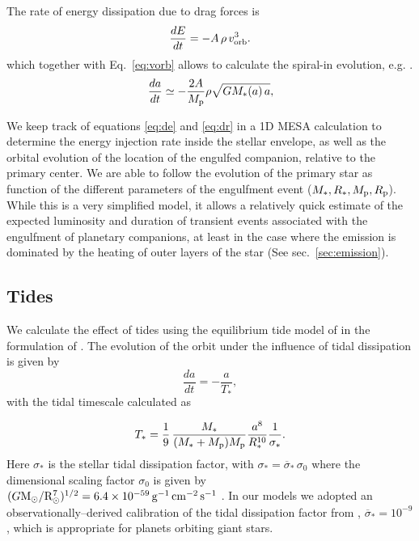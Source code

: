 \documentclass[twocolumn]{aastex62}
\newcommand{\mso}{\ensuremath{{\rm M}_\odot}}
\newcommand{\rso}{\ensuremath{{\rm R}_\odot}}
\begin{document}
The rate of energy dissipation due to drag forces is 
\begin{equation}\label{eq:de}
\frac{dE}{dt} = - A\, \rho \,v_{\rm orb}^3 .
\end{equation}
which together with Eq.~\ref{eq:vorb} allows to calculate the spiral-in evolution, e.g. \citet{Tylenda:2006}. 
\begin{equation}\label{eq:dr}
\frac{da}{dt} \simeq -\frac{2A}{M_{\rm p}} \rho \sqrt{G M_*(a)\, a},
\end{equation}

We keep track of equations \ref{eq:de} and \ref{eq:dr} in a 1D MESA calculation to determine the energy injection rate inside the stellar envelope, as well as the orbital evolution of the location of the engulfed companion, relative to the primary center.  
We are able to follow the evolution of the primary star as function of the different parameters of the engulfment event ($M_*, R_*, M_{\rm p}, R_{\rm p}$). While this is a very simplified model, it allows a relatively quick estimate of the expected luminosity and duration of transient events associated with the engulfment of planetary companions, at least in the case where the emission is dominated by the heating of outer layers of the star (See sec.~\ref{sec:emission}).

\subsection{Tides}
We calculate the effect of tides using the equilibrium tide model of \citet{Hut:1981} in the formulation of \citet{Eggleton:1998}. 
The evolution of the orbit under the influence of tidal dissipation is given by 
\begin{equation}\label{eq:dr_tides}
\frac{da}{dt} = -\frac{a}{T_*},
\end{equation}
with the tidal timescale calculated as 

\begin{equation}\label{eq:t_tides}
T_* = \frac{1}{9}\,\frac{M_*}{(M_*+M_{\rm p})M_{\rm p}} \frac{a^8}{R_*^{10}} \frac{1}{\sigma_*}.
\end{equation}
Here $\sigma_*$ is the stellar tidal dissipation factor, with $\sigma_* = \overline{{\sigma}}_* \, \sigma_0$ where the dimensional scaling factor $\sigma_0$ is given by $(G\mso/\rso^7)^{1/2} = 6.4\times10^{-59}\, {\rm g}^{-1} \, {\rm cm}^{-2}\, {\rm s}^{-1}$ \citep{Hansen:2010}. In our models  we adopted an observationally--derived calibration of the tidal dissipation factor from \citet{Hansen:2012}, $\overline{{\sigma}}_* = 10^{-9}$, which is appropriate for planets orbiting giant stars.   
\end{document}

